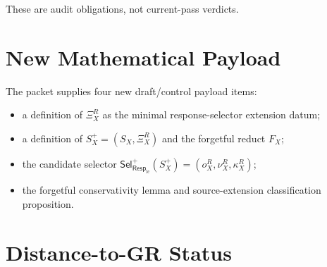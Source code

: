 \documentclass[11pt]{article}
\newcommand{\RespLC}{\mathsf{Resp}_{\mathrm{lc}}}
\newcommand{\SelResp}{\mathsf{Sel}_{\RespLC}}
\newcommand{\XiR}{\Xi_X^R}
\newcommand{\SX}{S_X}
\newcommand{\Splus}{S_X^+}
\begin{document}
These are audit obligations, not current-pass verdicts.

\section{New Mathematical Payload}

The packet supplies four new draft/control payload items:
\begin{itemize}
  \item a definition of \(\XiR\) as the minimal response-selector
  extension datum;
  \item a definition of \(\Splus=(\SX,\XiR)\) and the forgetful reduct
  \(F_X\);
  \item the candidate selector
  \(\SelResp^{+}(\Splus)=(o_X^R,\nu_X^R,\kappa_X^R)\);
  \item the forgetful conservativity lemma and source-extension
  classification proposition.
\end{itemize}

\section{Distance-to-GR Status}
\end{document}
